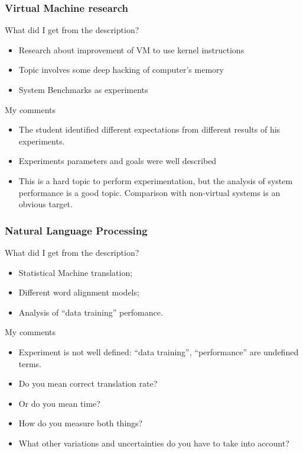 \documentclass[10pt]{beamer}
\begin{document}
\begin{frame}
  \frametitle{Virtual Machine research}
  \begin{block}{What did I get from the description?}
    \begin{itemize}
    \item Research about improvement of VM to use kernel instructions
    \item Topic involves some deep hacking of computer's memory
    \item System Benchmarks as experiments
    \end{itemize}
  \end{block}
  \begin{block}{My comments}
    \begin{itemize}
    \item The student identified different expectations from different
      results of his experiments.
    \item Experiments parameters and goals were well described
    \item This is a hard topic to perform experimentation, but the
      analysis of system performance is a good topic. Comparison with
      non-virtual systems is an obvious target.
    \end{itemize}
  \end{block}
\end{frame}

\begin{frame}
  \frametitle{Natural Language Processing}
  \begin{block}{What did I get from the description?}
    \begin{itemize}
    \item Statistical Machine translation;
    \item Different word alignment models;
    \item Analysis of ``data training'' perfomance.
    \end{itemize}
  \end{block}
  \begin{block}{My comments}
    \begin{itemize}
    \item Experiment is not well defined: ``data training'',
      ``performance'' are undefined terms.
    \item Do you mean correct translation rate?
    \item Or do you mean time?
    \item How do you measure both things?
    \item What other variations and uncertainties do you have to take
      into account?
    \end{itemize}
  \end{block}
\end{frame}
\end{document}
